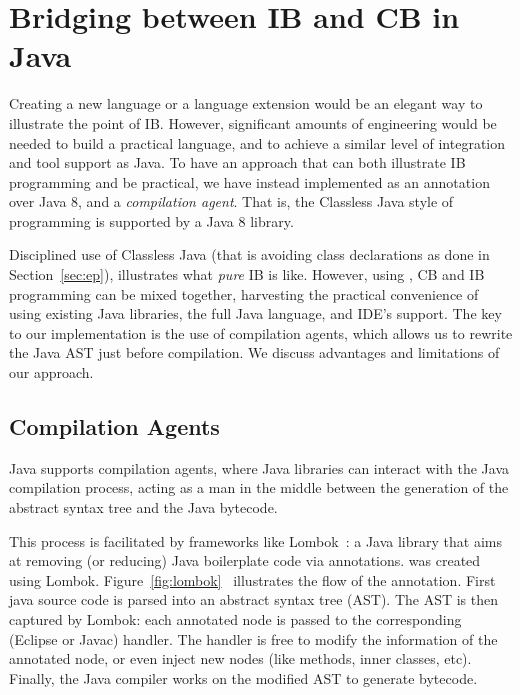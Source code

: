 \section{Bridging between IB and CB in Java}\label{sec:imp}


Creating a new language or a language extension would be an
elegant way to illustrate the point of IB. However,
significant amounts of engineering would be needed to build a practical
language, and to achieve a similar level of integration and tool support
as Java. To have an approach that can both illustrate IB
programming and be practical, we have instead implemented
\mixin as an annotation over Java 8, and a \emph{compilation agent}.
That is, the Classless Java style of programming
is supported by a Java 8 library.

Disciplined use of Classless Java (that is avoiding class
declarations as done in Section~\ref{sec:ep}), illustrates what \emph{pure} IB is like.
However, using \mixin, CB and IB programming can be mixed together,
harvesting the practical convenience of using existing Java libraries, the full
Java language, and IDE's support.
The key to our implementation is the use of compilation agents, which
 allows us to rewrite the Java AST just
before compilation. We discuss advantages and limitations of our approach.

\subsection{Compilation Agents}
Java supports compilation agents, where Java libraries can interact with the Java compilation process,
acting as a man in the middle between the
generation of the abstract syntax tree and the Java bytecode.

This process is facilitated by frameworks like Lombok~\cite{lombok}:
a Java library that aims at removing (or
reducing) Java boilerplate code via
annotations. \mixin was created using Lombok.
Figure~\ref{fig:lombok}~\cite{neildo2011blog} illustrates the flow of
the \mixin annotation.
First java source code is parsed into an abstract syntax tree (AST).
The AST is then captured by Lombok:
each annotated node is passed to
the corresponding (Eclipse or Javac) handler. The handler is
free to modify the information of the annotated node, or even inject new nodes (like methods, inner classes,
etc). Finally, the Java compiler works on the modified AST to generate bytecode.


